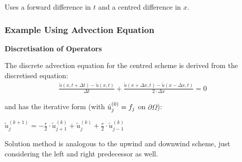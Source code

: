 
Uses a forward difference in $t$ and a centred difference in $x$.

\subsubsection{Example Using Advection Equation}


\textbf{Discretisation of Operators}

The discrete advection equation for the centred scheme is derived from the discretised equation:
\begin{align*}
	{\frac{\tilde{u}(x,t+\Delta t)-\tilde{u}(x,t)}{\Delta t}}+{\frac{\tilde{u}(x+\Delta x,t)-\tilde{u}(x-\Delta x,t)}{2\cdot\Delta x}}=0
\end{align*}

and has the iterative form (with $\tilde{u}_j^{(0)}=f_j$ on $\partial\Omega$):

\colorbox{shadecolor}{$
	\tilde{u}_{j}^{(k+1)}=-\frac{r}{2}\cdot\tilde{u}_{j+1}^{(k)}+\tilde{u}_{j}^{(k)}+\frac{r}{2}\cdot\tilde{u}_{j-1}^{(k)}
$}

Solution method is analogous to the upwind and downwind scheme,
just considering the left and right predecessor as well.